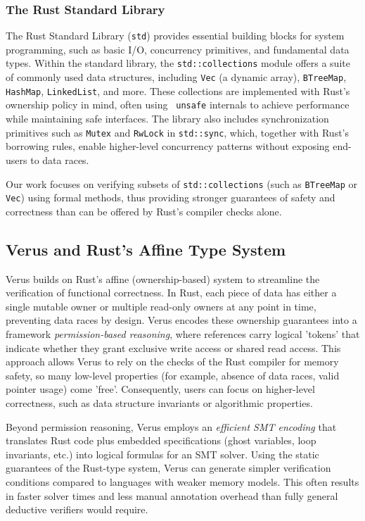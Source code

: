 \documentclass[conference]{IEEEtran}
\begin{document}
\subsubsection{The Rust Standard Library}
The Rust Standard Library (\texttt{std}) provides essential building blocks for system programming, such as basic I/O, concurrency primitives, and fundamental data types. Within the standard library, the \texttt{std::collections} module offers a suite of commonly used data structures, including \texttt{Vec} (a dynamic array), \texttt{BTreeMap}, \texttt{HashMap}, \texttt{LinkedList}, and more. These collections are implemented with Rust’s ownership policy in mind, often using \texttt{ unsafe} internals to achieve performance while maintaining safe interfaces. The library also includes synchronization primitives such as \texttt{Mutex} and \texttt{RwLock} in \texttt{std::sync}, which, together with Rust's borrowing rules, enable higher-level concurrency patterns without exposing end-users to data races.  

Our work focuses on verifying subsets of \texttt{std::collections} (such as \texttt{BTreeMap} or \texttt{Vec}) using formal methods, thus providing stronger guarantees of safety and correctness than can be offered by Rust’s compiler checks alone.



\subsection{Verus and Rust’s Affine Type System}

Verus builds on Rust's affine (ownership-based) system to streamline the verification of functional correctness. In Rust, each piece of data has either a single mutable owner or multiple read-only owners at any point in time, preventing data races by design. Verus encodes these ownership guarantees into a framework \emph{permission-based reasoning}, where references carry logical 'tokens' that indicate whether they grant exclusive write access or shared read access. This approach allows Verus to rely on the checks of the Rust compiler for memory safety, so many low-level properties (for example, absence of data races, valid pointer usage) come 'free'. Consequently, users can focus on higher-level correctness, such as data structure invariants or algorithmic properties.

Beyond permission reasoning, Verus employs an \emph{efficient SMT encoding} that translates Rust code plus embedded specifications (ghost variables, loop invariants, etc.) into logical formulas for an SMT solver. Using the static guarantees of the Rust-type system, Verus can generate simpler verification conditions compared to languages with weaker memory models. This often results in faster solver times and less manual annotation overhead than fully general deductive verifiers would require.
\end{document}
